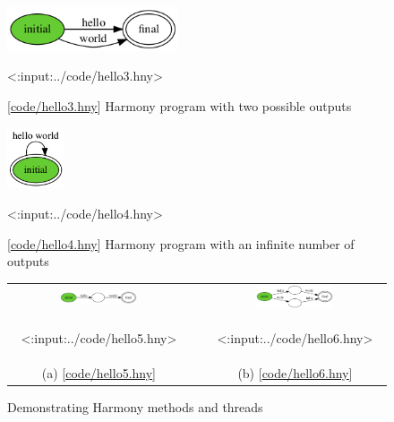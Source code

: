 \documentclass{report}
\newcommand{\harmonylink}[1]{%
[\href{https://harmony.cs.cornell.edu/#1}{\underline{#1}}]%
}
\newenvironment{code}{
\tcolorbox
}{
\endtcolorbox
}
\begin{document}
\begin{figure}
\begin{center}
\includegraphics[width=0.45\textwidth]{figures/hello3.png}
\end{center}
\begin{code}
<{:input:../code/hello3.hny}>
\end{code}
\caption{\harmonylink{code/hello3.hny} Harmony program with two possible outputs}
\label{fig:choice}
\end{figure}

\begin{figure}
\begin{center}
\includegraphics[width=0.15\textwidth]{figures/hello4.png}
\end{center}
\begin{code}
<{:input:../code/hello4.hny}>
\end{code}
\caption{\harmonylink{code/hello4.hny} Harmony program with an infinite number of outputs}
\label{fig:hello4}
\end{figure}

\begin{figure}[h]
\begin{center}
\begin{tabular}{ccc}
\includegraphics[width=0.45\textwidth]{figures/hello5.png}
& \rule{0.05\linewidth}{0in} &
\includegraphics[width=0.45\textwidth]{figures/hello6.png} \\
\begin{tcolorbox}[width=0.4\linewidth]
<{:input:../code/hello5.hny}>
\end{tcolorbox}
& \rule{0.05\linewidth}{0in} &
\begin{tcolorbox}[width=0.4\linewidth]
<{:input:../code/hello6.hny}>
\end{tcolorbox}
\\
(a) \harmonylink{code/hello5.hny} && (b) \harmonylink{code/hello6.hny}
\end{tabular}
\end{center}
\caption{Demonstrating Harmony methods and threads}
\label{fig:threads}
\end{figure}
\end{document}
